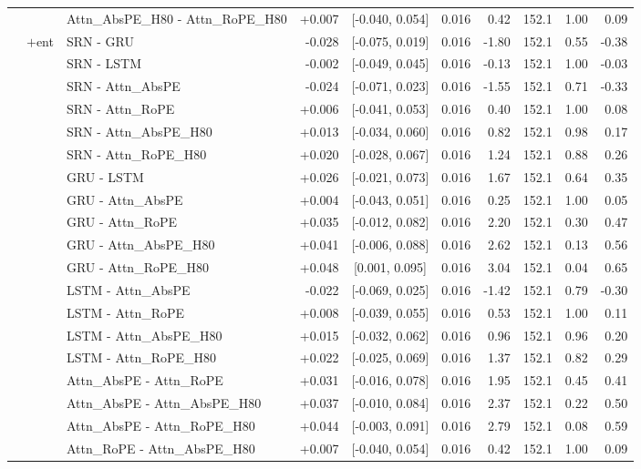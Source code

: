 \begin{longtable}{@{}lllrcrrrrr@{}}
 &  & Attn\_AbsPE\_H80 - Attn\_RoPE\_H80 & +0.007 & [-0.040, 0.054] & 0.016 & 0.42 & 152.1 & 1.00 & 0.09 \\
\addlinespace[2pt]
 & $+$ent & SRN - GRU & -0.028 & [-0.075, 0.019] & 0.016 & -1.80 & 152.1 & 0.55 & -0.38 \\
 &  & SRN - LSTM & -0.002 & [-0.049, 0.045] & 0.016 & -0.13 & 152.1 & 1.00 & -0.03 \\
 &  & SRN - Attn\_AbsPE & -0.024 & [-0.071, 0.023] & 0.016 & -1.55 & 152.1 & 0.71 & -0.33 \\
 &  & SRN - Attn\_RoPE & +0.006 & [-0.041, 0.053] & 0.016 & 0.40 & 152.1 & 1.00 & 0.08 \\
 &  & SRN - Attn\_AbsPE\_H80 & +0.013 & [-0.034, 0.060] & 0.016 & 0.82 & 152.1 & 0.98 & 0.17 \\
 &  & SRN - Attn\_RoPE\_H80 & +0.020 & [-0.028, 0.067] & 0.016 & 1.24 & 152.1 & 0.88 & 0.26 \\
 &  & GRU - LSTM & +0.026 & [-0.021, 0.073] & 0.016 & 1.67 & 152.1 & 0.64 & 0.35 \\
 &  & GRU - Attn\_AbsPE & +0.004 & [-0.043, 0.051] & 0.016 & 0.25 & 152.1 & 1.00 & 0.05 \\
 &  & GRU - Attn\_RoPE & +0.035 & [-0.012, 0.082] & 0.016 & 2.20 & 152.1 & 0.30 & 0.47 \\
 &  & GRU - Attn\_AbsPE\_H80 & +0.041 & [-0.006, 0.088] & 0.016 & 2.62 & 152.1 & 0.13 & 0.56 \\
 &  & GRU - Attn\_RoPE\_H80 & +0.048 & [0.001, 0.095] & 0.016 & 3.04 & 152.1 & 0.04 & 0.65 \\
 &  & LSTM - Attn\_AbsPE & -0.022 & [-0.069, 0.025] & 0.016 & -1.42 & 152.1 & 0.79 & -0.30 \\
 &  & LSTM - Attn\_RoPE & +0.008 & [-0.039, 0.055] & 0.016 & 0.53 & 152.1 & 1.00 & 0.11 \\
 &  & LSTM - Attn\_AbsPE\_H80 & +0.015 & [-0.032, 0.062] & 0.016 & 0.96 & 152.1 & 0.96 & 0.20 \\
 &  & LSTM - Attn\_RoPE\_H80 & +0.022 & [-0.025, 0.069] & 0.016 & 1.37 & 152.1 & 0.82 & 0.29 \\
 &  & Attn\_AbsPE - Attn\_RoPE & +0.031 & [-0.016, 0.078] & 0.016 & 1.95 & 152.1 & 0.45 & 0.41 \\
 &  & Attn\_AbsPE - Attn\_AbsPE\_H80 & +0.037 & [-0.010, 0.084] & 0.016 & 2.37 & 152.1 & 0.22 & 0.50 \\
 &  & Attn\_AbsPE - Attn\_RoPE\_H80 & +0.044 & [-0.003, 0.091] & 0.016 & 2.79 & 152.1 & 0.08 & 0.59 \\
 &  & Attn\_RoPE - Attn\_AbsPE\_H80 & +0.007 & [-0.040, 0.054] & 0.016 & 0.42 & 152.1 & 1.00 & 0.09 \\

\end{longtable}
